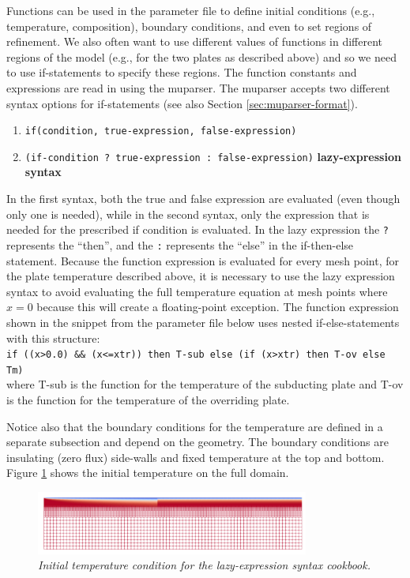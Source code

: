 \documentclass{article}
\begin{document}
Functions can be used in the parameter file to define initial conditions (e.g., temperature, composition), boundary conditions, and even to set regions of refinement. We also often want to use different values of functions in different regions of the model (e.g., for the two plates as described above) and so we need to use if-statements to specify these regions. The function constants and expressions are read in using the muparser. The muparser accepts two different syntax options for if-statements (see also Section \ref{sec:muparser-format}).
\begin{enumerate}
\item \texttt{if(condition, true-expression, false-expression)}
\item \texttt{(if-condition ?\ true-expression :\ false-expression)}  \textbf{lazy-expression syntax}
\end{enumerate}
In the first syntax, both the true and false expression are evaluated (even though only one is needed), while in the second  syntax, only the expression that is needed for the prescribed if condition is evaluated. In the lazy expression the \texttt{?} represents the ``then'', and the \texttt{:} represents the ``else'' in the if-then-else statement. Because the function expression is evaluated for every mesh point, for the plate temperature described above, it is necessary to use the lazy expression syntax to avoid evaluating the full temperature equation at mesh points where $x=0$ because this will create a floating-point exception.  The function expression shown in the snippet from the parameter file below uses nested if-else-statements with this structure:\\
\texttt{if ((x>0.0) \&\& (x<=xtr))  then T-sub else (if (x>xtr) then T-ov else Tm)}\\
where T-sub is the function for the temperature of the subducting plate and T-ov is the function for the temperature of the
overriding plate.

Notice also that the boundary conditions for the temperature are defined in a separate subsection and depend on the geometry.
The boundary conditions are insulating (zero flux) side-walls and fixed temperature at the top and bottom. Figure \ref{lazy-expression-tempic} shows the initial temperature on the full domain.
\begin{figure}
\centering
\includegraphics[width=0.8\textwidth]{cookbooks/muparser-temperature-example/doc/initial_temperature.png}
\caption{\it Initial temperature condition for the lazy-expression syntax cookbook. \label{lazy-expression-tempic}}
\end{figure}
\end{document}
